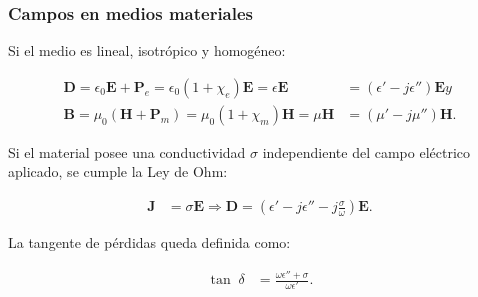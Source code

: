\documentclass{beamer}
\renewcommand{\vec}[1]{\boldsymbol{#1}}
\begin{document}
		\begin{frame}
		\frametitle{Campos en medios materiales}
		Si el medio es lineal, isotrópico y homogéneo: %
		
		\begin{align*}
		\vec{D} = \epsilon_0 \vec{E} + \vec{P}_e = \epsilon_0 (1+\chi_e)\vec{E} = \epsilon \vec{E} &= (\epsilon' - j \epsilon'') \vec{E} y\\
		\vec{B} = \mu_0 (\vec{H} + \vec{P}_m) = \mu_0 (1+\chi_m)\vec{H} = \mu \vec{H} &= (\mu' - j \mu'') \vec{H}.
		\end{align*}
		
		Si el material posee una conductividad $\sigma$ independiente del campo eléctrico aplicado, se cumple la Ley de Ohm:
		
		\begin{align*}
		\vec{J} &= \sigma \vec{E} \Rightarrow \vec{D} = \left( \epsilon' - j\epsilon'' - j \frac{\sigma}{\omega} \right) \vec{E}.
		\end{align*}
		
		La tangente de pérdidas queda definida como:
		
		\begin{align*}
		\tan \; \delta &= \frac{\omega \epsilon'' + \sigma}{\omega \epsilon'}.
		\end{align*}
		
		
		\end{frame}
		
\end{document}

